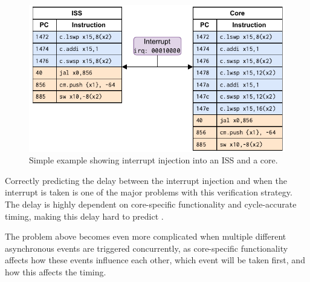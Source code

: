 \begin{figure}
    \centering
    \includegraphics[width=0.75\linewidth]{figures/lw_add_sw_example.pdf}
    \caption{Simple example showing interrupt injection into an ISS and a core.}
    \label{fig:lw_example}
\end{figure}

Correctly predicting the delay between the interrupt injection and when the interrupt is taken is one of the major problems with this verification strategy. The delay is highly dependent on core-specific functionality and cycle-accurate timing, making this delay hard to predict \cite{taylorAdvancedRISCVVerification2023}. 

The problem above becomes even more complicated when multiple different asynchronous events are triggered concurrently, as core-specific functionality affects how these events influence each other, which event will be taken first, and how this affects the timing. 






%



%
%


%    

